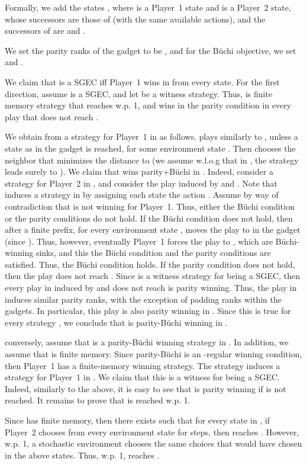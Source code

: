 \documentclass[runningheads,a4paper]{llncs}
\newcommand{\buchi}{B\"uchi\xspace}
\newcommand{\sgec}{{SGEC}\xspace}
\begin{document}
Formally, we add the states , where  is a Player~1 state and  is a Player~2 state, whose successors are those of  (with the same available actions), and the successors of  are  and .

We set the parity ranks of the gadget to be , and for the \buchi objective, we set  and .

We claim that  is a \sgec iff Player~1 wins in  from every state. For the first direction, assume  is a \sgec, and let  be a witness strategy. Thus,  is finite memory strategy that reaches  w.p. 1, and wins in the parity condition in every play that does not reach .

We obtain from  a strategy  for Player~1 in  as follows.  plays similarly to , unless a state  as in the gadget  is reached, for some environment state . Then  chooses the neighbor that minimizes the distance to  (we assume w.l.o.g that in , the strategy  leads surely to ). We claim that  wins parity+\buchi in . Indeed, consider a strategy  for Player~2 in , and consider the play  induced by  and . Note that  induces a strategy in  by assigning each state  the action .
Assume by way of contradiction that  is not winning for Player~1. Thus, either the \buchi condition or the parity conditions do not hold. If the \buchi condition does not hold, then after a finite prefix, for every environment state ,  moves the play to  in the gadget (since ). Thus, however, eventually Player~1 forces the play to , which are \buchi-winning sinks, and this the \buchi condition and the parity conditions are satisfied. Thus, the \buchi condition holds. If the parity condition does not hold, then the play does not reach . Since  is a witness strategy for  being a \sgec, then every play in  induced by  and does not reach  is parity winning. Thus, the play in  induces similar parity ranks, with the exception of padding  ranks within the gadgets. In particular, this play is also parity winning in . Since this is true for every strategy , we conclude that  is parity-\buchi winning in .

conversely, assume that  is a parity-\buchi winning strategy in . In addition, we assume that  is finite memory. Since parity-\buchi is an -regular winning condition, then Player~1 has a finite-memory winning strategy. The strategy  induces a strategy for Player~1 in . We claim that this is a witness for  being a \sgec.
Indeed, similarly to the above, it is easy to see that  is parity winning if  is not reached. It remains to prove that  is reached w.p. 1. 

Since  has finite memory, then there exists  such that for every state  in , if Player~2 chooses  from every environment state  for  steps, then  reaches . However, w.p. 1, a stochastic environment chooses the same  choices that  would have chosen in the above  states. Thus, w.p. 1,  reaches .
\end{document}
